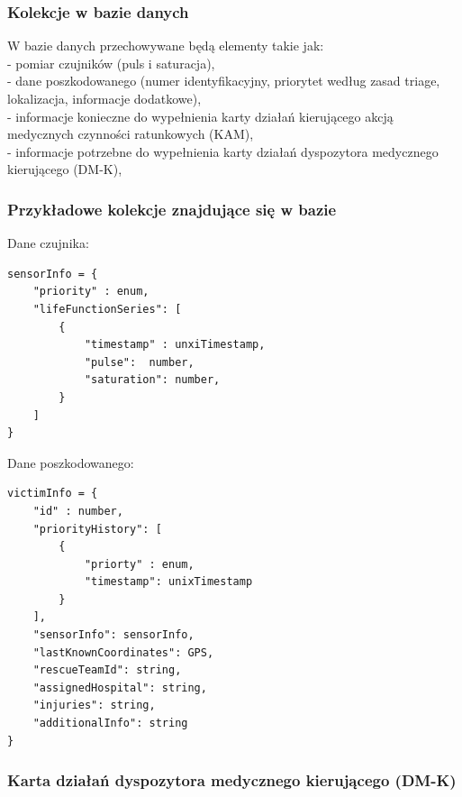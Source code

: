 \newpage

\subsubsection{Kolekcje w bazie danych}
W bazie danych przechowywane będą elementy takie jak: \\
- pomiar czujników (puls i saturacja), \\
- dane poszkodowanego (numer identyfikacyjny, priorytet według zasad triage, lokalizacja, informacje dodatkowe), \\
- informacje konieczne do wypełnienia karty działań kierującego akcją medycznych czynności ratunkowych (KAM), \\
- informacje potrzebne do wypełnienia karty działań dyspozytora medycznego kierującego (DM-K), \\


\subsubsection{Przykładowe kolekcje znajdujące się w bazie}


Dane czujnika:
\begin{verbatim}
sensorInfo = {
    "priority" : enum,
    "lifeFunctionSeries": [
        {
            "timestamp" : unxiTimestamp,
            "pulse":  number,
            "saturation": number,
        }
    ]
}
\end{verbatim}
Dane poszkodowanego:
\begin{verbatim}
victimInfo = {
    "id" : number,
    "priorityHistory": [
        {
            "priorty" : enum,
            "timestamp": unixTimestamp
        }
    ],
    "sensorInfo": sensorInfo,
    "lastKnownCoordinates": GPS,
    "rescueTeamId": string,
    "assignedHospital": string,
    "injuries": string,
    "additionalInfo": string    
}
\end{verbatim}
\newpage
\subsubsection{Karta działań dyspozytora medycznego kierującego (DM-K)}

